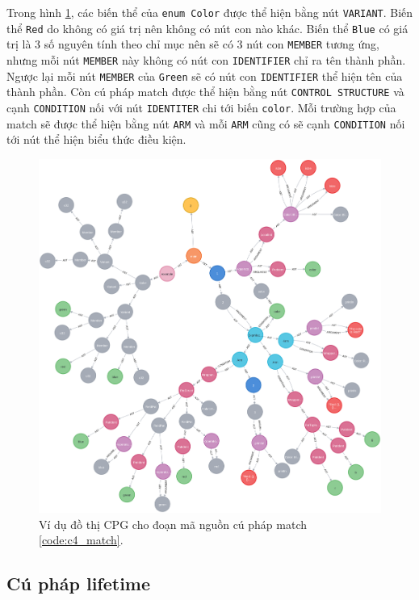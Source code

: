 Trong hình \ref{img:c4_match}, các biến thể của \texttt{enum Color} được thể hiện bằng nút \texttt{VARIANT}.
Biến thể \texttt{Red} do không có giá trị nên không có nút con nào khác.
Biến thể \texttt{Blue} có giá trị là 3 số nguyên tính theo chỉ mục nên sẽ có 3 nút con \texttt{MEMBER} tương ứng, nhưng mỗi nút \texttt{MEMBER} này không có nút con \texttt{IDENTIFIER} chỉ ra tên thành phần.
Ngược lại mỗi nút \texttt{MEMBER} của \texttt{Green} sẽ có nút con \texttt{IDENTIFIER} thể hiện tên của thành phần.
Còn cú pháp match được thể hiện bằng nút \texttt{CONTROL STRUCTURE} và cạnh \texttt{CONDITION} nối với nút \texttt{IDENTITER} chi tới biến \texttt{color}.
Mỗi trường hợp của match sẽ được thể hiện bằng nút \texttt{ARM} và mỗi \texttt{ARM} cũng có sẽ cạnh \texttt{CONDITION} nối tới nút thể hiện biểu thức điều kiện.

\begin{figure}[H]
    \includegraphics[width=1\columnwidth]{figures/c4/c4_match.png}
    \centering
    \caption{Ví dụ đồ thị CPG cho đoạn mã nguồn cú pháp match \ref{code:c4_match}.}
    \label{img:c4_match}
\end{figure}

\subsection{Cú pháp lifetime}

